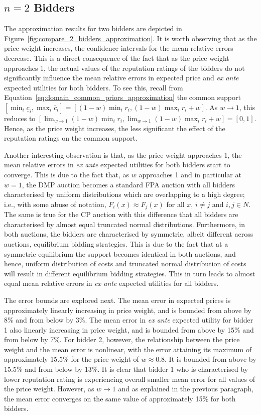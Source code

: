 \subsection{$n=2$ Bidders} %
\label{sub:n_2_bidders_approximation}
The approximation results for two bidders are depicted in Figure~\ref{fig:compare_2_bidders_approximation}. It is worth observing that as the price weight increases, the confidence intervals for the mean relative errors decrease. This is a direct consequence of the fact that as the price weight approaches 1, the actual values of the reputation ratings of the bidders do not significantly influence the mean relative errors in expected price and \emph{ex ante} expected utilities for both bidders. To see this, recall from Equation~\eqref{eq:domain_common_priors_approximation} the common support $[\min_i{\underline{c}_i}, \max_i{\bar{c}_i}]=[(1-w)\min_i{r_i}, (1-w)\max_i{r_i} + w]$. As $w\to 1$, this reduces to $[\lim_{w\to 1}(1-w)\min_i{r_i}, \lim_{w\to 1}(1-w)\max_i{r_i} + w] = [0,1]$. Hence, as the price weight increases, the less significant the effect of the reputation ratings on the common support.

Another interesting observation is that, as the price weight approaches 1, the mean relative errors in \emph{ex ante} expected utilities for both bidders start to converge. This is due to the fact that, as $w$ approaches 1 and in particular at $w=1$, the DMP auction becomes a standard FPA auction with all bidders characterised by uniform distributions which are overlapping to a high degree; i.e., with some abuse of notation, $F_i(x)\approx F_j(x)$ for all $x$, $i\neq j$ and $i,j\in N$. The same is true for the CP auction with this difference that all bidders are characterised by almost equal truncated normal distributions. Furthermore, in both auctions, the bidders are characterised by symmetric, albeit different across auctions, equilibrium bidding strategies. This is due to the fact that at a symmetric equilibrium the support becomes identical in both auctions, and hence, uniform distribution of costs and truncated normal distribution of costs will result in different equilibrium bidding strategies. This in turn leads to almost equal mean relative errors in \emph{ex ante} expected utilities for all bidders.

The error bounds are explored next. The mean error in expected prices is approximately linearly increasing in price weight, and is bounded from above by 8\% and from below by 3\%. The mean error in \emph{ex ante} expected utility for bidder 1 also linearly increasing in price weight, and is bounded from above by 15\% and from below by 7\%. For bidder 2, however, the relationship between the price weight and the mean error is nonlinear, with the error attaining its maximum of approximately 15.5\% for the price weight of $w\approx 0.8$. It is bounded from above by 15.5\% and from below by 13\%. It is clear that bidder 1 who is characterised by lower reputation rating is experiencing overall smaller mean error for all values of the price weight. However, as $w\to 1$ and as explained in the previous paragraph, the mean error converges on the same value of approximately 15\% for both bidders.

